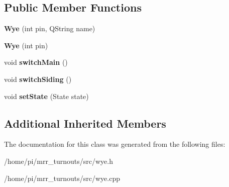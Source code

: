 \subsection*{Public Member Functions}
\begin{DoxyCompactItemize}
\item 
\mbox{\label{classWye_a3e77a490a8ed9769ae614ed6c0b5120d}} 
{\bfseries Wye} (int pin, Q\+String name)
\item 
\mbox{\label{classWye_ad9b9aec2c48aaf06f000bf1777ec8e02}} 
{\bfseries Wye} (int pin)
\item 
\mbox{\label{classWye_ad6d6484f6e9fc7076ca8974eb32d7a64}} 
void {\bfseries switch\+Main} ()
\item 
\mbox{\label{classWye_ac74866da6e73a1f1c692dbdeea6804be}} 
void {\bfseries switch\+Siding} ()
\item 
\mbox{\label{classWye_a2a0551f36af31b003502f0ce976f0044}} 
void {\bfseries set\+State} (State state)
\end{DoxyCompactItemize}
\subsection*{Additional Inherited Members}


The documentation for this class was generated from the following files\+:\begin{DoxyCompactItemize}
\item 
/home/pi/mrr\+\_\+turnouts/src/wye.\+h\item 
/home/pi/mrr\+\_\+turnouts/src/wye.\+cpp\end{DoxyCompactItemize}

